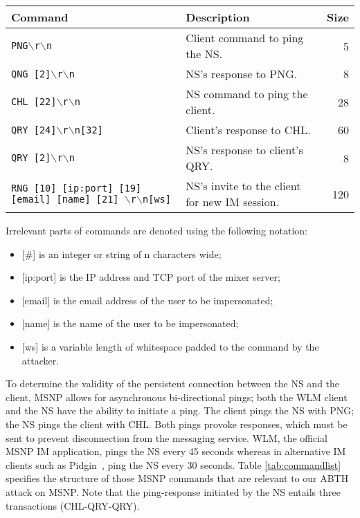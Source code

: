 \documentclass{sig-alternate}
\begin{document}
\begin{table*}[tbp]
	\centering

	\caption {MSNP Commands}
	\label{tab:commandlist}

	\begin{tabular}{llr}
		\hline
		\hline
		\textbf{Command} & \textbf{Description} & \textbf{Size} \\
		\hline
		\texttt{PNG$\backslash$r$\backslash$n} & Client command to ping the NS. & 5 \\
		\texttt{QNG [2]$\backslash$r$\backslash$n} & NS's response to PNG. & 8 \\
		\texttt{CHL [22]$\backslash$r$\backslash$n} & NS command to ping the client. & 28 \\
		\texttt{QRY [24]$\backslash$r$\backslash$n[32]} & Client's response to CHL. & 60 \\
		\texttt{QRY [2]$\backslash$r$\backslash$n} & NS's response to client's QRY. & 8 \\
		\texttt{RNG [10] [ip:port] [19] [email] [name] [21] $\backslash$r$\backslash$n[ws]} & NS's invite to the client for new IM session. & 120 \\
		\hline
	\end{tabular}

	\begin{flushleft}
	Irrelevant parts of commands are denoted using the following notation:
	\begin{itemize}
		\item {[\#]} is an integer or string of n characters wide;
		\item {[ip:port]} is the IP address and TCP port of the mixer server;
		\item {[email]} is the email address of the user to be impersonated;
		\item {[name]} is the name of the user to be impersonated;
		\item {[ws]} is a variable length of whitespace padded to the command by the attacker.
	\end{itemize}
	\end{flushleft}

\end{table*}

To determine the validity of the persistent connection between the NS and the client, MSNP allows for asynchronous bi-directional pings; both the WLM client and the NS have the ability to initiate a ping.
The client pings the NS with PNG; the NS pings the client with CHL.
Both pings provoke responses, which must be sent to prevent disconnection from the messaging service.
WLM, the official MSNP IM application, pings the NS every 45 seconds whereas in alternative IM clients such as Pidgin~\cite{pidgin:url}, ping the NS every 30 seconds.
Table \ref{tab:commandlist} specifies the structure of those MSNP commands that are relevant to our ABTH attack on MSNP.
Note that the ping-response initiated by the NS entails three transactions (CHL-QRY-QRY).
\end{document}
